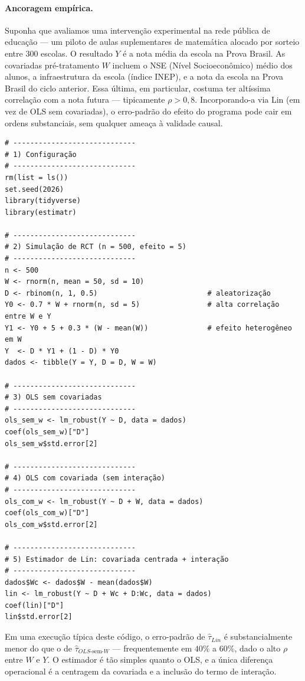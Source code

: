 \paragraph{Ancoragem empírica.} Suponha que avaliamos uma intervenção experimental na rede pública de educação --- um piloto de aulas suplementares de matemática alocado por sorteio entre $300$ escolas. O resultado $Y$ é a nota média da escola na Prova Brasil. As covariadas pré-tratamento $W$ incluem o NSE (Nível Socioeconômico) médio dos alunos, a infraestrutura da escola (índice INEP), e a nota da escola na Prova Brasil do ciclo anterior. Essa última, em particular, costuma ter altíssima correlação com a nota futura --- tipicamente $\rho > 0{,}8$. Incorporando-a via Lin (em vez de OLS sem covariadas), o erro-padrão do efeito do programa pode cair em ordens substanciais, sem qualquer ameaça à validade causal.

\begin{lstlisting}[caption={Estimador de Lin em um RCT.}, label={lst:lin}]
# -----------------------------
# 1) Configuração
# -----------------------------
rm(list = ls())
set.seed(2026)
library(tidyverse)
library(estimatr)

# -----------------------------
# 2) Simulação de RCT (n = 500, efeito = 5)
# -----------------------------
n <- 500
W <- rnorm(n, mean = 50, sd = 10)
D <- rbinom(n, 1, 0.5)                          # aleatorização
Y0 <- 0.7 * W + rnorm(n, sd = 5)                # alta correlação entre W e Y
Y1 <- Y0 + 5 + 0.3 * (W - mean(W))              # efeito heterogêneo em W
Y  <- D * Y1 + (1 - D) * Y0
dados <- tibble(Y = Y, D = D, W = W)

# -----------------------------
# 3) OLS sem covariadas
# -----------------------------
ols_sem_w <- lm_robust(Y ~ D, data = dados)
coef(ols_sem_w)["D"]
ols_sem_w$std.error[2]

# -----------------------------
# 4) OLS com covariada (sem interação)
# -----------------------------
ols_com_w <- lm_robust(Y ~ D + W, data = dados)
coef(ols_com_w)["D"]
ols_com_w$std.error[2]

# -----------------------------
# 5) Estimador de Lin: covariada centrada + interação
# -----------------------------
dados$Wc <- dados$W - mean(dados$W)
lin <- lm_robust(Y ~ D + Wc + D:Wc, data = dados)
coef(lin)["D"]
lin$std.error[2]
\end{lstlisting}

Em uma execução típica deste código, o erro-padrão de $\hat{\tau}_{Lin}$ é substancialmente menor do que o de $\hat{\tau}_{OLS\text{-sem-}W}$ --- frequentemente em $40\%$ a $60\%$, dado o alto $\rho$ entre $W$ e $Y$. O estimador é tão simples quanto o OLS, e a única diferença operacional é a centragem da covariada e a inclusão do termo de interação.

